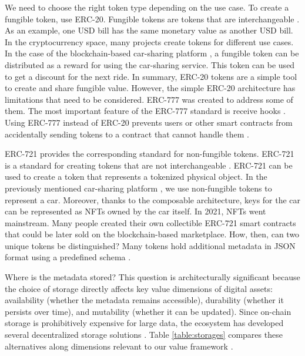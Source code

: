 We need to choose the right token type depending on the use case. To create a fungible token, use ERC-20.
Fungible tokens are tokens that are interchangeable \cite{vogelsteller2015erc}.
As an example, one USD bill has the same monetary value as another USD bill. In the cryptocurrency space,
many projects create tokens for different use cases. In the case of the blockchain-based car-sharing platform \cite{valastin2019}, a fungible token can be distributed as a reward for using the car-sharing service.
This token can be used to get a discount for the next ride. In summary, ERC-20 tokens are a simple tool to create and share fungible value.
However, the simple ERC-20 architecture has limitations that need to be considered. ERC-777 was created to address some of them.
The most important feature of the ERC-777 standard is receive hooks \cite{Dafflon2017}.
Using ERC-777 instead of ERC-20 prevents users or other smart contracts from accidentally sending tokens to a contract that cannot handle them \cite{EIP777}.

ERC-721 provides the corresponding standard for non-fungible tokens.
ERC-721 is a standard for creating tokens that are not interchangeable \cite{entrikennon}.
ERC-721 can be used to create a token that represents a tokenized physical object.
In the previously mentioned car-sharing platform \cite{valastin2019}, we use non-fungible tokens to represent a car.
Moreover, thanks to the composable architecture, keys for the car can be represented as NFTs owned by the car itself.
In 2021, NFTs went mainstream. Many people created their own collectible ERC-721 smart contracts that could be later sold on the blockchain-based marketplace.
How, then, can two unique tokens be distinguished? Many tokens hold additional metadata in JSON format using a predefined schema \cite{entrikennon, Morgan2018}.

Where is the metadata stored? This question is architecturally significant because the choice of storage directly affects key value dimensions of digital assets: availability (whether the metadata remains accessible), durability (whether it persists over time), and mutability (whether it can be updated). Since on-chain storage is prohibitively expensive for large data, the ecosystem has developed several decentralized storage solutions \cite{Benet2014, Wilkinson2014, Williams2019}.
Table \ref{table:storages} compares these alternatives along dimensions relevant to our value framework \cite{Daniel2022}.

